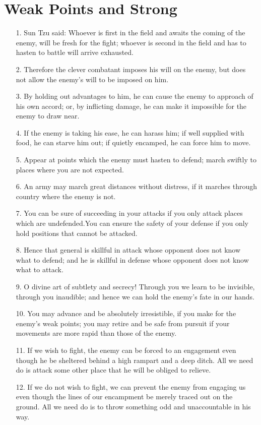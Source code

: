 \documentclass[11pt,openany]{memoir}
\newcommand{\enumeratemargin}{1.30em}
\begin{document}
\chapter{Weak Points and Strong}
\begin{enumerate}[leftmargin=\enumeratemargin]
\item[1.] Sun Tzu said: Whoever is first in the field and awaits the coming of the enemy, will be fresh for the fight; whoever is second in the field and has to hasten to battle will arrive exhausted.
\item[2.] Therefore the clever combatant imposes his will on the enemy, but does not allow the enemy's will to be imposed on him.
\item[3.] By holding out advantages to him, he can cause the enemy to approach of his own accord; or, by inflicting damage, he can make it impossible for the enemy to draw near.
\item[4.] If the enemy is taking his ease, he can harass him; if well supplied with food, he can starve him out; if quietly encamped, he can force him to move.
\item[5.] Appear at points which the enemy must hasten to defend; march swiftly to places where you are not expected.
\item[6.] An army may march great distances without distress, if it marches through country where the enemy is not.
\item[7.] You can be sure of succeeding in your attacks if you only attack places which are undefended.You can ensure the safety of your defense if you only hold positions that cannot be attacked.
\item[8.] Hence that general is skillful in attack whose opponent does not know what to defend; and he is skillful in defense whose opponent does not know what to attack.
\item[9.] O divine art of subtlety and secrecy! Through you we learn to be invisible, through you inaudible; and hence we can hold the enemy's fate in our hands.
\item[10.] You may advance and be absolutely irresistible, if you make for the enemy's weak points; you may retire and be safe from pursuit if your movements are more rapid than those of the enemy.
\item[11.] If we wish to fight, the enemy can be forced to an engagement even though he be sheltered behind a high rampart and a deep ditch. All we need do is attack some other place that he will be obliged to relieve.
\item[12.] If we do not wish to fight, we can prevent the enemy from engaging us even though the lines of our encampment be merely traced out on the ground. All we need do is to throw something odd and unaccountable in his way.

\end{enumerate}
\end{document}
